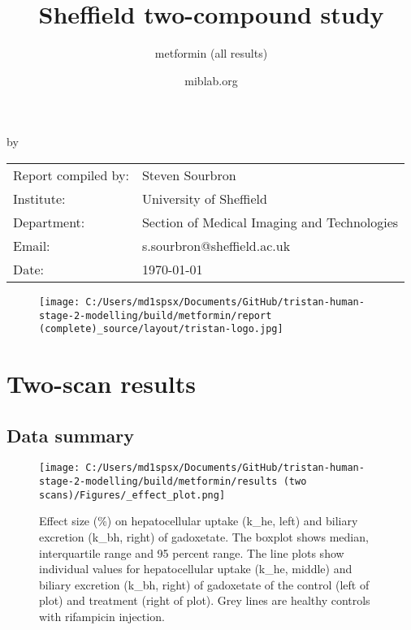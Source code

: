 \documentclass{epflreport}%
\begin{document}
%
\normalsize%
\frontmatter%
\title{Sheffield two{-}compound study}%
\subtitle{metformin (all results)}%
\author{miblab.org}%
\subject{D2.10 {-} Internal report}%
%
%
%
\makecover%
\begin{titlepage}%
\begin{center}%
\makeatletter%
\largetitlestyle\fontsize{45}{45}\selectfont\@title%
\makeatother%
\linebreak%
\makeatletter%
\ifdefvoid{\@subtitle}{}{\bigskip\titlestyle\fontsize{20}{20}\selectfont\@subtitle}%
\makeatother%
\linebreak%
\bigskip%
\bigskip%
by%
\linebreak%
\bigskip%
\bigskip%
\makeatletter%
\largetitlestyle\fontsize{25}{25}\selectfont\@author%
\makeatother%
\vfill%
\large%
\begin{tabular}{ll}%
\hline%
Report compiled by: &Steven Sourbron\\%
Institute: &University of Sheffield\\%
Department: &Section of Medical Imaging and Technologies\\%
Email: &s.sourbron@sheffield.ac.uk\\%
Date: &\today\\%
\hline%
\end{tabular}%


\begin{figure}[b!]%
\centering%
\centering%
\texttt{[image: C:/Users/md1spsx/Documents/GitHub/tristan-human-stage-2-modelling/build/metformin/report (complete)\_source/layout/tristan-logo.jpg]}%
\end{figure}

%
\end{center}%
\end{titlepage}%
\newpage%
\tableofcontents%
\mainmatter%
\clearpage%
\chapter{Two{-}scan results}%
\section{Data summary}%
\label{sec:Datasummary}%

%


\begin{figure}[h!]%
\centering%
\texttt{[image: C:/Users/md1spsx/Documents/GitHub/tristan-human-stage-2-modelling/build/metformin/results (two scans)/Figures/\_effect\_plot.png]}%
\caption{Effect size (\%) on hepatocellular uptake (k\_he, left) and biliary excretion (k\_bh, right) of gadoxetate. The boxplot shows median, interquartile range and 95 percent range. The line plots show individual values for hepatocellular uptake (k\_he, middle) and biliary excretion (k\_bh, right) of gadoxetate of the control (left of plot) and treatment (right of plot). Grey lines are healthy controls with rifampicin injection.}%
\end{figure}
\end{document}
